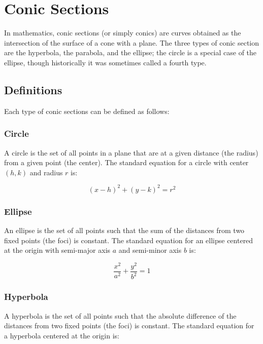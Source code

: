 \chapter{Conic Sections}

In mathematics, conic sections (or simply conics) are curves obtained
as the intersection of the surface of a cone with a plane. The three
types of conic section are the hyperbola, the parabola, and the
ellipse; the circle is a special case of the ellipse, though
historically it was sometimes called a fourth type.

\section{Definitions}

Each type of conic sections can be defined as follows:

\subsection{Circle}

A circle is the set of all points in a plane that are at a given
distance (the radius) from a given point (the center). The standard
equation for a circle with center $(h,k)$ and radius $r$ is:

\begin{equation}
(x - h)^2 + (y - k)^2 = r^2
\end{equation}

\subsection{Ellipse}

An ellipse is the set of all points such that the sum of the distances
from two fixed points (the foci) is constant. The standard equation
for an ellipse centered at the origin with semi-major axis $a$ and
semi-minor axis $b$ is:

\begin{equation}
\frac{x^2}{a^2} + \frac{y^2}{b^2} = 1
\end{equation}

\subsection{Hyperbola}

A hyperbola is the set of all points such that the absolute difference
of the distances from two fixed points (the foci) is constant. The
standard equation for a hyperbola centered at the origin is:

